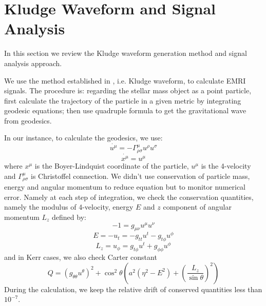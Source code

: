 \documentclass{article}
\begin{document}

\section{Kludge Waveform and Signal Analysis}
\label{p_wave}

In this section we review the Kludge waveform generation method and signal analysis approach. 


We use the method established in \cite{kludge}, i.e. Kludge waveform, to calculate EMRI signals. The procedure is: regarding the stellar mass object as a point particle, first calculate the trajectory of the particle in a given metric by integrating geodesic equations; then use quadruple formula to get the gravitational wave from geodesics.

In our instance, to calculate the geodesics, we use:
\begin{equation}
	\dot{u^\mu}=-\Gamma^\mu_{\rho\sigma}u^\rho u^\sigma
\end{equation}
\begin{equation}
	\dot{x^\mu}=u^\mu 
\end{equation}
where $x^\mu$ is the Boyer-Lindquist coordinate of the particle, $u^\mu$ is the 4-velocity and $\Gamma^\mu_{\rho\sigma}$ is Christoffel connection. We didn't use conservation of particle mass, energy and angular momentum to reduce equation but to monitor numerical error. Namely at each step of integration, we check the conservation quantities, namely the modulus of 4-velocity, energy $E$ and $z$ component of angular momentum $L_z$ defined by:
\begin{equation}
	-1 = g_{\mu\nu} u^\mu u^\nu
\end{equation}
\begin{equation}
	E = -u_t = - g_{tt} u^t -g_{t\phi} u^\phi
\end{equation}
\begin{equation}
	L_z = u_\phi = g_{t\phi } u^t + g_{\phi\phi} u^\phi
\end{equation}
 and in Kerr cases, we also check Carter constant
 \begin{equation}
 	Q = (g_{\theta\theta} u^\theta)^2 + \cos ^2 \theta (a^2 (\eta^2-E^2) + (\frac{L_z}{\sin \theta})^2 )
 \end{equation}
During the calculation, we keep the relative drift of conserved quantities less than $10^{-7}$.
\end{document}
